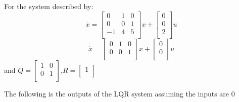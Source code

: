 For the system described by: 
\begin{equation}
\dot x = 
\begin{bmatrix}
  0 & 1 & 0\\
  0 & 0 & 1\\
  -1 & 4 & 5\\
\end{bmatrix}x + 
\begin{bmatrix}
  0\\
  0\\
  2\\
\end{bmatrix}u
\end{equation}
\begin{equation}
\dot x = 
\begin{bmatrix}
  0 & 1 & 0\\
  0 & 0 & 1\\
\end{bmatrix}x + 
\begin{bmatrix}
  0\\
  0\\
\end{bmatrix}u
\end{equation}
 and $Q = 
\begin{bmatrix}
  1 & 0\\
  0 & 1\\
\end{bmatrix}$,$R = 
\begin{bmatrix}
  1\\
\end{bmatrix}$

The following is the outputs of the LQR system assuming the inputs are 0

